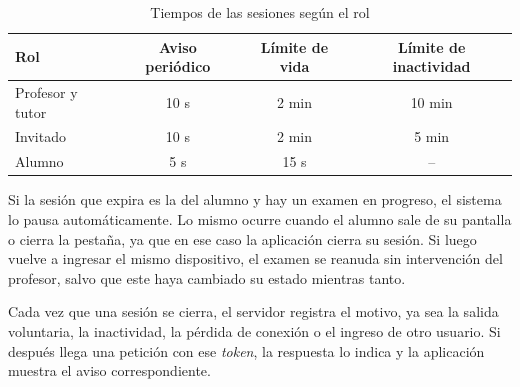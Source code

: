 \begin{table}[H]
    \centering
    \caption{Tiempos de las sesiones según el rol}
    \label{tab:tiempos_sesion}
    \begin{tabular}{|l|c|c|c|}
        \hline
        \textbf{Rol} & \textbf{Aviso periódico} & \textbf{Límite de vida} & \textbf{Límite de inactividad} \\
        \hline
        Profesor y tutor & 10 s & 2 min & 10 min \\
        \hline
        Invitado & 10 s & 2 min & 5 min \\
        \hline
        Alumno & 5 s & 15 s & -- \\
        \hline
    \end{tabular}
\end{table}



Si la sesión que expira es la del alumno y hay un examen en progreso, el sistema lo pausa automáticamente. Lo mismo ocurre cuando el alumno sale de su pantalla o cierra la pestaña, ya que en ese caso la aplicación cierra su sesión. Si luego vuelve a ingresar el mismo dispositivo, el examen se reanuda sin intervención del profesor, salvo que este haya cambiado su estado mientras tanto.

Cada vez que una sesión se cierra, el servidor registra el motivo, ya sea la salida voluntaria, la inactividad, la pérdida de conexión o el ingreso de otro usuario. Si después llega una petición con ese \emph{token}, la respuesta lo indica y la aplicación muestra el aviso correspondiente.



